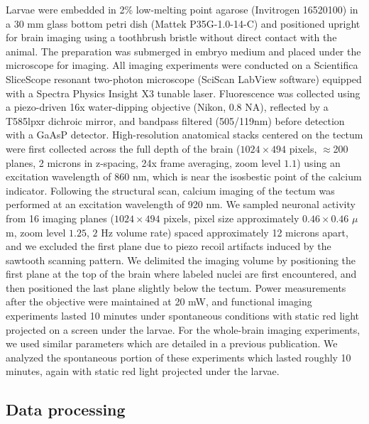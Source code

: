 \documentclass{article}
\begin{document}
Larvae were embedded in 2\% low-melting point agarose (Invitrogen 16520100) in a 30 mm glass bottom petri dish (Mattek P35G-1.0-14-C) and positioned upright for brain imaging using a toothbrush bristle without direct contact with the animal. The preparation was submerged in embryo medium and placed under the microscope for imaging. All imaging experiments were conducted on a Scientifica SliceScope resonant two-photon microscope (SciScan LabView software) equipped with a Spectra Physics Insight X3 tunable laser. Fluorescence was collected using a piezo-driven 16x water-dipping objective (Nikon, 0.8 NA), reflected by a T585lpxr dichroic mirror, and bandpass filtered (505/119nm) before detection with a GaAsP detector. High-resolution anatomical stacks centered on the tectum were first collected across the full depth of the brain ($1024\times494$ pixels, $\approx$200 planes, 2 microns in z-spacing, 24x frame averaging, zoom level $1.1$) using an excitation wavelength of 860 nm, which is near the isosbestic point of the calcium indicator. Following the structural scan, calcium imaging of the tectum was performed at an excitation wavelength of 920 nm. We sampled neuronal activity from 16 imaging planes ($1024\times494$ pixels, pixel size approximately $0.46\times0.46$ $\mu$m, zoom level $1.25$, $2$ Hz volume rate) spaced approximately 12 microns apart, and we excluded the first plane due to piezo recoil artifacts induced by the sawtooth scanning pattern. We delimited the imaging volume by positioning the first plane at the top of the brain where labeled nuclei are first encountered, and then positioned the last plane slightly below the tectum. Power measurements after the objective were maintained at 20 mW, and functional imaging experiments lasted 10 minutes under spontaneous conditions with static red light projected on a screen under the larvae. For the whole-brain imaging experiments, we used similar parameters which are detailed in a previous publication\cite{legare2025structural}. We analyzed the spontaneous portion of these experiments which lasted roughly 10 minutes, again with static red light projected under the larvae.

\subsection*{Data processing}
\end{document}
